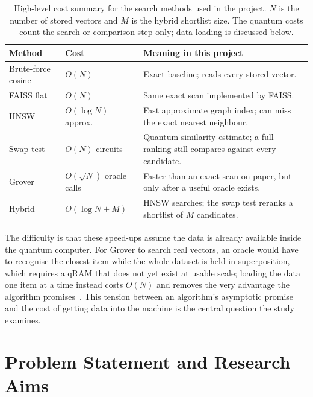 \begin{table}[htbp]
  \centering
  \caption[Algorithm cost summary]{High-level cost summary for the search
  methods used in the project. $N$ is the number of stored vectors and $M$ is the
  hybrid shortlist size. The quantum costs count the search or comparison step
  only; data loading is discussed below.}
  \label{tab:early_cost}
  \renewcommand{\arraystretch}{1.3}
  \begin{tabularx}{\linewidth}{l l >{\raggedright\arraybackslash}X}
    \toprule
    \textbf{Method} & \textbf{Cost} & \textbf{Meaning in this project} \\
    \midrule
    Brute-force cosine & $O(N)$ & Exact baseline; reads every stored vector. \\
    \addlinespace
    FAISS flat & $O(N)$ & Same exact scan implemented by FAISS. \\
    \addlinespace
    HNSW & $O(\log N)$ approx. & Fast approximate graph index; can miss the exact nearest neighbour. \\
    \addlinespace
    Swap test & $O(N)$ circuits & Quantum similarity estimate; a full ranking still compares against every candidate. \\
    \addlinespace
    Grover & $O(\sqrt{N})$ oracle calls & Faster than an exact scan on paper, but only after a useful oracle exists. \\
    \addlinespace
    Hybrid & $O(\log N + M)$ & HNSW searches; the swap test reranks a shortlist of $M$ candidates. \\
    \bottomrule
  \end{tabularx}
\end{table}

The difficulty is that these speed-ups assume the data is already available
inside the quantum computer. For Grover to search real vectors, an oracle would
have to recognise the closest item while the whole dataset is held in
superposition, which requires a qRAM that does not yet exist at usable scale;
loading the data one item at a time instead costs $O(N)$
and removes the very advantage the algorithm promises~\cite{aaronson2015readfine}.
This tension between an algorithm's asymptotic promise and the cost of getting
data into the machine is the central question the study examines.

\section{Problem Statement and Research Aims}
\label{sec:problem}

